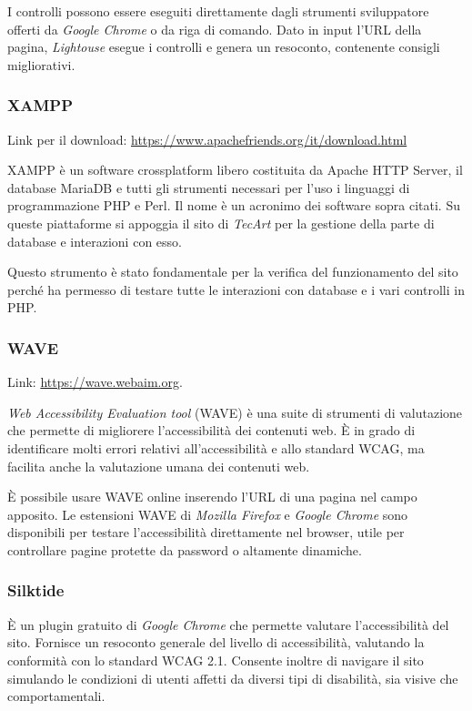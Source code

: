 I controlli possono essere eseguiti direttamente dagli strumenti sviluppatore offerti da \textit{Google Chrome} o da riga di comando. Dato in input l'URL della pagina, \textit{Lightouse} esegue i controlli e genera un resoconto, contenente consigli migliorativi. 


\subsubsection{XAMPP}
\label{test-strumenti-xampp-mamp}
Link per il download: \url{https://www.apachefriends.org/it/download.html}

XAMPP è un software crossplatform libero costituita da Apache HTTP Server, il database MariaDB e tutti gli strumenti necessari per l'uso i linguaggi di programmazione PHP e Perl. Il nome è un acronimo dei software sopra citati. Su queste piattaforme si appoggia il sito di \textit{TecArt} per la gestione della parte di database e interazioni con esso.

Questo strumento è stato fondamentale per la verifica del funzionamento del sito perché ha permesso di testare tutte le interazioni con database e i vari controlli in PHP.


\subsubsection{WAVE}
\label{test-strumenti-wave}
Link: \url{https://wave.webaim.org}.

\textit{Web Accessibility Evaluation tool} (WAVE) è una suite di strumenti di valutazione che permette di migliorere l'accessibilità dei contenuti web. È in grado di identificare molti errori relativi all'accessibilità e allo standard WCAG, ma facilita anche la valutazione umana dei contenuti web.

È possibile usare WAVE online inserendo l'URL di una pagina nel campo apposito. Le estensioni WAVE di \textit{Mozilla Firefox} e \textit{Google Chrome} sono disponibili per testare l'accessibilità direttamente nel browser, utile per controllare pagine protette da password o altamente dinamiche. 


\subsubsection{Silktide}
\label{test-strumenti-silktide}
È un plugin gratuito di \textit{Google Chrome} che permette valutare l'accessibilità del sito. Fornisce un resoconto generale del livello di accessibilità, valutando la conformità con lo standard WCAG 2.1. Consente inoltre di navigare il sito simulando le condizioni di utenti affetti da diversi tipi di disabilità, sia visive che comportamentali. 


